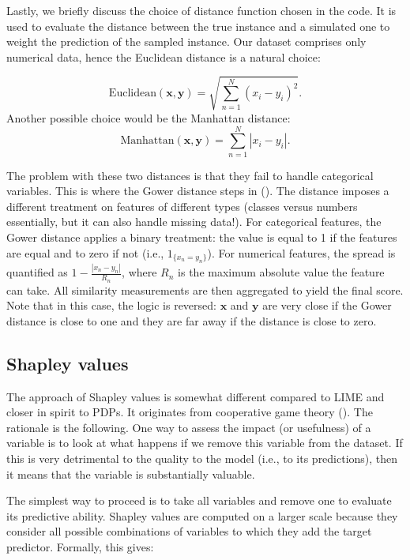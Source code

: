 \documentclass[]{krantz}
\theoremstyle{definition}
\theoremstyle{definition}
\theoremstyle{definition}
\theoremstyle{remark}
\begin{document}
Lastly, we briefly discuss the choice of distance function chosen in the
code. It is used to evaluate the distance between the true instance and
a simulated one to weight the prediction of the sampled instance. Our
dataset comprises only numerical data, hence the Euclidean distance is a
natural choice:

\[\text{Euclidean}(\textbf{x}, \textbf{y})=\sqrt{\sum_{n=1}^N(x_i-y_i)^2}.\]
Another possible choice would be the Manhattan distance:
\[\text{Manhattan}(\textbf{x}, \textbf{y})=\sum_{n=1}^N|x_i-y_i|.\]

The problem with these two distances is that they fail to handle
categorical variables. This is where the Gower distance steps in
(\citet{gower1971general}). The distance imposes a different treatment
on features of different types (classes versus numbers essentially, but
it can also handle missing data!). For categorical features, the Gower
distance applies a binary treatment: the value is equal to 1 if the
features are equal and to zero if not (i.e., \(1_{\{x_n=y_n\}}\)). For
numerical features, the spread is quantified as
\(1-\frac{|x_n-y_n|}{R_n}\), where \(R_n\) is the maximum absolute value
the feature can take. All similarity measurements are then aggregated to
yield the final score. Note that in this case, the logic is reversed:
\(\textbf{x}\) and \(\textbf{y}\) are very close if the Gower distance
is close to one and they are far away if the distance is close to zero.

\hypertarget{shapley-values}{%
\subsection{Shapley values}\label{shapley-values}}

The approach of Shapley values is somewhat different compared to LIME
and closer in spirit to PDPs. It originates from cooperative game theory
(\citet{shapley1953value}). The rationale is the following. One way to
assess the impact (or usefulness) of a variable is to look at what
happens if we remove this variable from the dataset. If this is very
detrimental to the quality to the model (i.e., to its predictions), then
it means that the variable is substantially valuable.

The simplest way to proceed is to take all variables and remove one to
evaluate its predictive ability. Shapley values are computed on a larger
scale because they consider all possible combinations of variables to
which they add the target predictor. Formally, this gives:
\end{document}
